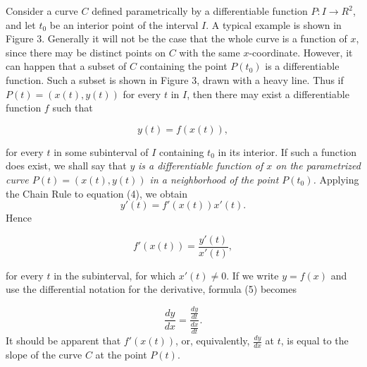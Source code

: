 Consider a curve $C$ defined parametrically by a differentiable function $P : I \rightarrow R^2$, and let $t_0$ be an interior point of the interval $I$. A typical example is shown in Figure 3. Generally it will not be the case that the whole curve is a function of $x$, since there may be distinct points on $C$ with the same $x$-coordinate. However, it can happen that a subset of $C$ containing the point $P(t_0)$ is a differentiable function. Such a subset is shown in Figure 3, drawn with a heavy line. Thus if $P(t) = (x(t), y(t))$ for every $t$ in $I$, then there may exist a differentiable function $f$ such that


\begin{equation}
y(t) = f(x(t)),  
\label{eq10.1.4}
\end{equation}


\noindent for every $t$ in some subinterval of $I$ containing $t_0$ in its interior. If such a function does exist, we shall say that $y$ \textit{is a differentiable function of $x$ on the parametrized curve $P(t) = (x(t), y(t))$ in a neighborhood of the point $P(t_0)$.}  Applying the Chain Rule to equation (4), we obtain
$$
y'(t) = f'(x(t)) x'(t) .
$$
\noindent Hence

\begin{equation}
f'(x(t)) = \frac{y'(t)}{x'(t)},
\label{eq10.1.5}
\end{equation}

\noindent for every $t$ in the subinterval, for which $x'(t) \neq 0$. If we write $y = f(x)$ and use the differential notation for the derivative, formula (5) becomes


\begin{equation}
\frac{dy}{dx} = \frac{\frac{dy}{dt}}{\frac{dx}{dt}}. 
\label{eq10.1.6}
\end{equation}
\noindent It should be apparent that $f'(x(t))$, or, equivalently, $\frac{dy}{dx}$ at $t$, is equal to the slope of the curve $C$ at the point $P(t)$.  


